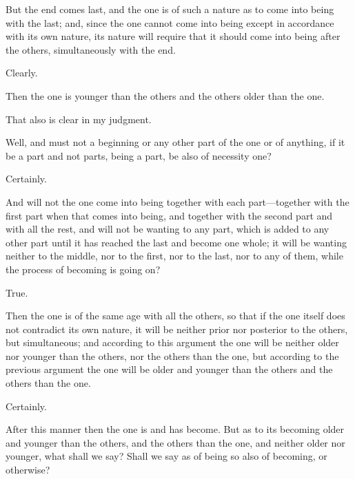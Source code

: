 \documentclass[11pt,letter]{article}
\begin{document}
\par  But the end comes last, and the one is of such a nature as to come into being with the last; and, since the one cannot come into being except in accordance with its own nature, its nature will require that it should come into being after the others, simultaneously with the end.

\par  Clearly.

\par  Then the one is younger than the others and the others older than the one.

\par  That also is clear in my judgment.

\par  Well, and must not a beginning or any other part of the one or of anything, if it be a part and not parts, being a part, be also of necessity one?

\par  Certainly.

\par  And will not the one come into being together with each part—together with the first part when that comes into being, and together with the second part and with all the rest, and will not be wanting to any part, which is added to any other part until it has reached the last and become one whole; it will be wanting neither to the middle, nor to the first, nor to the last, nor to any of them, while the process of becoming is going on?

\par  True.

\par  Then the one is of the same age with all the others, so that if the one itself does not contradict its own nature, it will be neither prior nor posterior to the others, but simultaneous; and according to this argument the one will be neither older nor younger than the others, nor the others than the one, but according to the previous argument the one will be older and younger than the others and the others than the one.

\par  Certainly.

\par  After this manner then the one is and has become. But as to its becoming older and younger than the others, and the others than the one, and neither older nor younger, what shall we say? Shall we say as of being so also of becoming, or otherwise?
\end{document}
